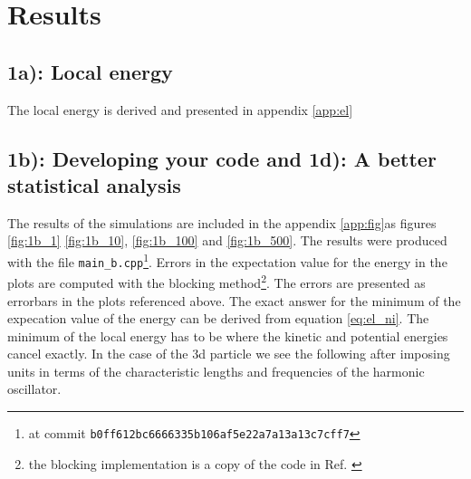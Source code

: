 \section{Results}
\subsection*{\textbf{1a):} Local energy}
The local energy is  derived and presented in appendix \ref{app:el}


\subsection*{\textbf{1b):} Developing your code and \textbf{1d):} A better statistical analysis}

The results of the simulations are included in the appendix \ref{app:fig}as figures \ref{fig:1b_1} \ref{fig:1b_10}, \ref{fig:1b_100} and \ref{fig:1b_500}. The results were produced with the file \lstinline{main_b.cpp}\footnote{at commit \lstinline{b0ff612bc6666335b106af5e22a7a13a13c7cff7}}. Errors in the expectation value for the energy in the plots are computed with the blocking method\footnote{the blocking implementation is a copy of the code in Ref. \cite{ComphysGit}}. The errors are presented as errorbars in the plots referenced above.
The exact answer for the minimum of the expecation value of the energy can be derived from equation \ref{eq:el_ni}. The minimum of the local energy has to be where the kinetic and potential energies cancel exactly. In the case of the 3d particle we see the following after imposing units in terms of the characteristic lengths and frequencies of the harmonic oscillator. 

